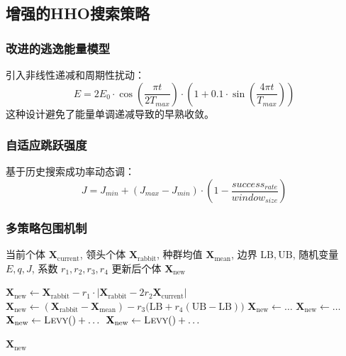 \documentclass[conference]{IEEEtran}
\begin{document}
\subsection{增强的HHO搜索策略}
\subsubsection{改进的逃逸能量模型}
引入非线性递减和周期性扰动\cite{b15}：
\begin{equation}
E = 2E_0 \cdot \cos\left(\frac{\pi t}{2T_{max}}\right) \cdot \left(1 + 0.1 \cdot \sin\left(\frac{4\pi t}{T_{max}}\right)\right)
\end{equation}
这种设计避免了能量单调递减导致的早熟收敛。
\subsubsection{自适应跳跃强度}
基于历史搜索成功率动态调\cite{b16}：
\begin{equation}
J = J_{min} + (J_{max} - J_{min}) \cdot \left(1 - \frac{success_{rate}}{window_{size}}\right)
\end{equation}
\subsubsection{多策略包围机制}
\label{subsec:multi_encircle}
\begin{algorithm}
  \caption{多策略包围更新}
  \label{alg:multi_encircle}
  \begin{algorithmic}[1]
    \REQUIRE 当前个体 $\mathbf{X}_{\text{current}}$,  
             领头个体 $\mathbf{X}_{\text{rabbit}}$,  
             种群均值 $\mathbf{X}_{\text{mean}}$,  
             边界 $\mathrm{LB},\mathrm{UB}$,  
             随机变量 $E,q,J$, 系数 $r_1,r_2,r_3,r_4$
    \ENSURE 更新后个体 $\mathbf{X}_{\text{new}}$

            \STATE $\mathbf{X}_{\text{new}} \leftarrow
                   \mathbf{X}_{\text{rabbit}}
                   - r_1 \cdot \bigl|
                     \mathbf{X}_{\text{rabbit}}
                     - 2 r_2 \mathbf{X}_{\text{current}}
                     \bigr|$
        \ELSE
            \STATE $\mathbf{X}_{\text{new}} \leftarrow
                   (\mathbf{X}_{\text{rabbit}} - \mathbf{X}_{\text{mean}})
                   - r_3 \bigl(\mathrm{LB}
                   + r_4(\mathrm{UB} - \mathrm{LB})\bigr)$
        \ENDIF
    \ELSE               %
            \STATE $\mathbf{X}_{\text{new}} \leftarrow \dots$   %
            \STATE $\mathbf{X}_{\text{new}} \leftarrow \dots$   %
            \STATE $\mathbf{X}_{\text{new}} \leftarrow
                   \textsc{Levy}() + \dots$                    %
        \ELSE
            \STATE $\mathbf{X}_{\text{new}} \leftarrow
                   \textsc{Levy}() + \dots$                    %
        \ENDIF
    \ENDIF

    \RETURN $\mathbf{X}_{\text{new}}$
  \end{algorithmic}
\end{algorithm}
\end{document}
